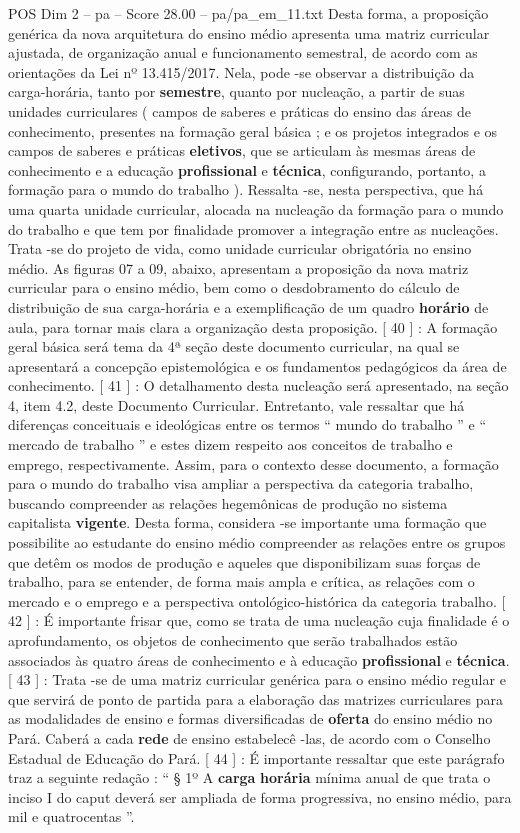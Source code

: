 \begin{textsample}{POS Dim 2 – pa – Score 28.00 – pa/pa\_em\_11.txt}
Desta forma, a proposição genérica da nova arquitetura do ensino médio apresenta uma matriz curricular ajustada, de organização anual e funcionamento semestral, de acordo com as orientações da Lei nº 13.415/2017.
Nela, pode -se observar a distribuição da carga-horária, tanto por \textbf{semestre}, quanto por nucleação, a partir de suas unidades curriculares ( campos de saberes e práticas do ensino das áreas de conhecimento, presentes na formação geral básica ; e os projetos integrados e os campos de saberes e práticas \textbf{eletivos}, que se articulam às mesmas áreas de conhecimento e a educação \textbf{profissional} e \textbf{técnica}, configurando, portanto, a formação para o mundo do trabalho ).
Ressalta -se, nesta perspectiva, que há uma quarta unidade curricular, alocada na nucleação da formação para o mundo do trabalho e que tem por finalidade promover a integração entre as nucleações.
Trata -se do projeto de vida, como unidade curricular obrigatória no ensino médio.
As figuras 07 a 09, abaixo, apresentam a proposição da nova matriz curricular para o ensino médio, bem como o desdobramento do cálculo de distribuição de sua carga-horária e a exemplificação de um quadro \textbf{horário} de aula, para tornar mais clara a organização desta proposição. [ 40 ] : A formação geral básica será tema da 4ª seção deste documento curricular, na qual se apresentará a concepção epistemológica e os fundamentos pedagógicos da área de conhecimento. [ 41 ] : O detalhamento desta nucleação será apresentado, na seção 4, item 4.2, deste Documento Curricular.
Entretanto, vale ressaltar que há diferenças conceituais e ideológicas entre os termos “ mundo do trabalho ” e “ mercado de trabalho ” e estes dizem respeito aos conceitos de trabalho e emprego, respectivamente.
Assim, para o contexto desse documento, a formação para o mundo do trabalho visa ampliar a perspectiva da categoria trabalho, buscando compreender as relações hegemônicas de produção no sistema capitalista \textbf{vigente}.
Desta forma, considera -se importante uma formação que possibilite ao estudante do ensino médio compreender as relações entre os grupos que detêm os modos de produção e aqueles que disponibilizam suas forças de trabalho, para se entender, de forma mais ampla e crítica, as relações com o mercado e o emprego e a perspectiva ontológico-histórica da categoria trabalho. [ 42 ] : É importante frisar que, como se trata de uma nucleação cuja finalidade é o aprofundamento, os objetos de conhecimento que serão trabalhados estão associados às quatro áreas de conhecimento e à educação \textbf{profissional} e \textbf{técnica}. [ 43 ] : Trata -se de uma matriz curricular genérica para o ensino médio regular e que servirá de ponto de partida para a elaboração das matrizes curriculares para as modalidades de ensino e formas diversificadas de \textbf{oferta} do ensino médio no Pará.
Caberá a cada \textbf{rede} de ensino estabelecê -las, de acordo com o Conselho Estadual de Educação do Pará. [ 44 ] : É importante ressaltar que este parágrafo traz a seguinte redação : “ § 1º A \textbf{carga} \textbf{horária} mínima anual de que trata o inciso I do caput deverá ser ampliada de forma progressiva, no ensino médio, para mil e quatrocentas ”.


\end{textsample}
